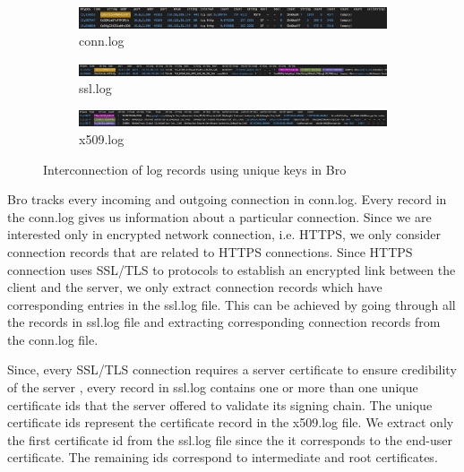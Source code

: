\begin{figure}[htb]
	\begin{center}
		\begin{subfigure}{1\textwidth}
			\includegraphics[width=1\textwidth]{images/conn-log.png} 
			\caption{conn.log}
			
			\vspace{0.4cm}
			
		\end{subfigure}
		\begin{subfigure}{1\textwidth}
			\includegraphics[width=1\textwidth]{images/ssl-log.png} 
			\caption{ssl.log}
			
			\vspace{0.4cm}
			
		\end{subfigure}
		\begin{subfigure}{1\textwidth}
			\includegraphics[width=1\textwidth]{images/x509-log.png}
			\caption{x509.log}
		\end{subfigure}
	\end{center}
	\caption{Interconnection of log records using unique keys in Bro} 
	\label{fig:interconnection}
\end{figure}

Bro tracks every incoming and outgoing connection in conn.log. Every record in the conn.log gives us information about a particular connection. Since we are interested only in encrypted network connection, i.e. HTTPS, we only consider connection records that are related to HTTPS connections. Since HTTPS connection uses SSL/TLS to protocols to establish an encrypted link between the client and the server, we only extract connection records which have corresponding entries in the ssl.log file. This can be achieved by going through all the records in ssl.log file and extracting corresponding connection records from the conn.log file.

Since, every SSL/TLS connection requires a server certificate to ensure credibility of the server \cite{RFC1601}, every record in ssl.log contains one or more than one unique certificate ids that the server offered to validate its signing chain. The unique certificate ids represent the certificate record in the x509.log file. We extract only the first certificate id from the ssl.log file since the it corresponds to the end-user certificate. The remaining ids correspond to intermediate and root certificates.

